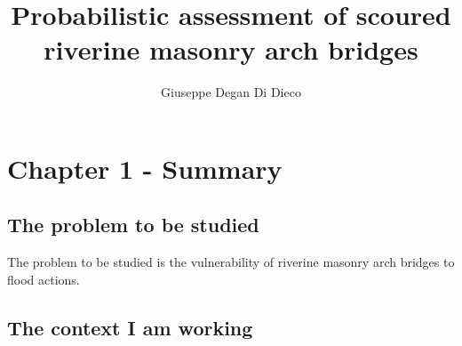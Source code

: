 \documentclass[a4paper, 12pt]{my-thesis}
\author{Giuseppe Degan Di Dieco}
\title{Probabilistic assessment of scoured riverine masonry arch bridges}
\begin{document}
\maketitle
\tableofcontents

\chapter*{Chapter 1 - Summary}
\section{The problem to be studied}
The problem to be studied is the vulnerability of riverine masonry arch bridges to flood actions.

\section{The context I am working}
\end{document}
